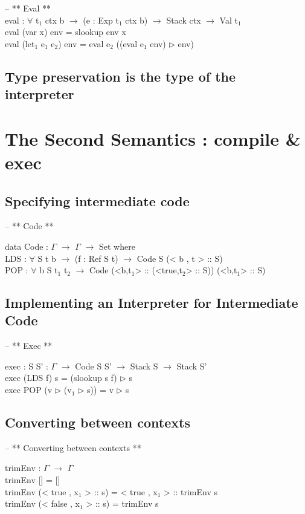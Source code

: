 \documentclass[paper=a4, fontsize=11pt]{scrartcl} %
\numberwithin{equation}{section} %
\numberwithin{figure}{section} %
\numberwithin{table}{section} %
\begin{document}
-- ** Eval **\\

eval : $\forall$ {t$_1$ ctx b} $\rightarrow$ (e : Exp t$_1$ ctx b) $\rightarrow$ Stack ctx $\rightarrow$ Val t$_1$\\
eval (var x) env = slookup env x\\
eval (let$_1$ e$_1$ e$_2$) env = eval e$_2$ ((eval e$_1$ env) $\rhd$ env)\\
\normalfont
\subsection{Type preservation is the type of the interpreter}
\section{The Second Semantics : compile \& exec}

\subsection{Specifying intermediate code}
\ttfamily
-- ** Code **

data Code : $\Gamma$ $\rightarrow$ $\Gamma$ $\rightarrow$ Set where\\
	LDS   : $\forall$ {S t b} $\rightarrow$ (f : Ref S t) $\rightarrow$ Code S (< b , t > :: S)\\
    POP   : $\forall$ {b S t$_1$ t$_2$} $\rightarrow$ Code (<b,t$_1$> :: (<true,t$_2$> :: S)) (<b,t$_1$> :: S)\\
\normalfont

\subsection{Implementing an Interpreter for Intermediate Code}
\ttfamily
-- ** Exec **

exec : {S S' : $\Gamma$} $\rightarrow$ Code S S' $\rightarrow$ Stack S $\rightarrow$ Stack S'\\
exec (LDS f) s = (slookup s f) $\rhd$ s\\
exec POP (v $\rhd$ (v$_1$ $\rhd$ s)) = v $\rhd$ s\\
\normalfont
\subsection{Converting between contexts}
\ttfamily
-- ** Converting between contexts **

trimEnv : $\Gamma$ $\rightarrow$ $\Gamma$\\
trimEnv [] = []\\
trimEnv (< true , x$_1$ > :: s) = < true , x$_1$ > :: trimEnv s\\
trimEnv (< false , x$_1$ > :: s) = trimEnv s\\
\end{document}
